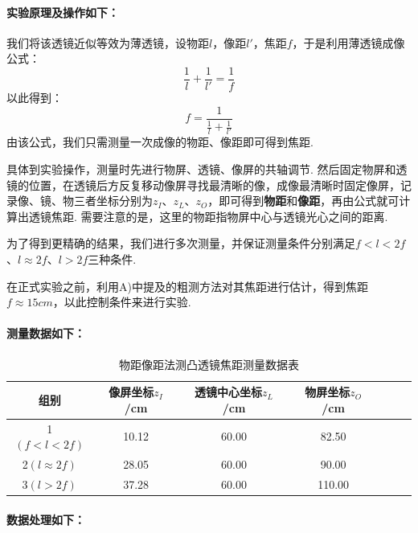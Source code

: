 \documentclass[UTF8]{ctexart}
\begin{document}
\paragraph{实验原理及操作如下：}\quad\par
我们将该透镜近似等效为薄透镜，设物距$l$，像距$l'$，焦距$f$，于是利用薄透镜成像公式：
\begin{equation}
    \frac{1}{l}+\frac{1}{l'}=\frac{1}{f}
\end{equation}
以此得到：
\begin{equation}
    \label{wujuxiangjufa}
    {f}=\frac{1}{\frac{1}{l}+\frac{1}{l'}}
\end{equation}
由该公式，我们只需测量一次成像的物距、像距即可得到焦距.\par
具体到实验操作，测量时先进行物屏、透镜、像屏的共轴调节. 然后固定物屏和透镜的位置，在透镜后方反复移动像屏寻找最清晰的像，成像最清晰时固定像屏，记录像、镜、物三者坐标分别为$z_I$、$z_L$、$z_O$，即可得到\textbf{物距}和\textbf{像距}，再由公式就可计算出透镜焦距. 需要注意的是，这里的物距指物屏中心与透镜光心之间的距离.\par
为了得到更精确的结果，我们进行多次测量，并保证测量条件分别满足$f<l<2f$、$l\approx 2f$、$l>2f$三种条件. \par
在正式实验之前，利用A)中提及的粗测方法对其焦距进行估计，得到焦距$f\approx 15cm$，以此控制条件来进行实验. \par

\paragraph{测量数据如下：}\quad\par
\begin{table}[H]\begin{center}
    \caption{物距像距法测凸透镜焦距测量数据表}
    \begin{tabular}{|c|c|c|c|c|c|c|}
        \hline
        组别&像屏坐标$z_I$/cm&透镜中心坐标$z_L$/cm&物屏坐标$z_O$/cm\\
        \hline
        1$(f<l<2f)$&10.12&60.00&82.50\\
        \hline
        2$(l\approx 2f)$&28.05&60.00&90.00\\
        \hline
        3$(l>2f)$&37.28&60.00&110.00\\
        \hline 
    \end{tabular}
\end{center}\end{table}
\paragraph{数据处理如下：}\quad\par
\end{document}

